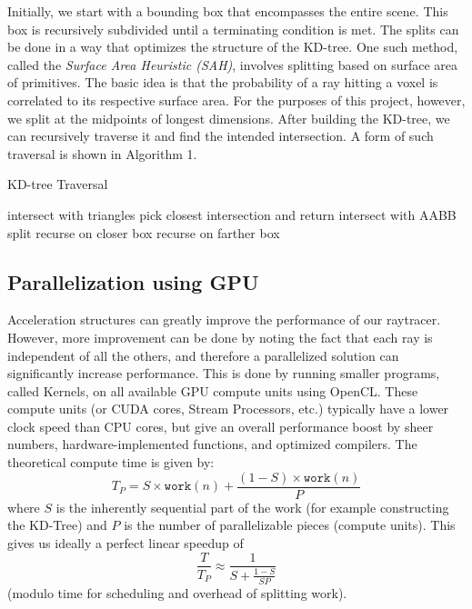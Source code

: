 \documentclass[letterpaper, 10 pt, conference]{ieeeconf}  %
\begin{document}
Initially, we start with a bounding box that encompasses the entire scene. This box is recursively subdivided until a terminating condition is met. The splits can be done in a way that optimizes the structure of the KD-tree. One such method, called the \textit{Surface Area Heuristic (SAH)}, involves splitting based on surface area of primitives. The basic idea is that the probability of a ray hitting a voxel is correlated to its respective surface area. For the purposes of this project, however, we split at the midpoints of longest dimensions. After building the KD-tree, we can recursively traverse it and find the intended intersection. A form of such traversal is shown in Algorithm 1.  

\begin{algorithm}[H]
\caption{KD-tree Traversal}
\begin{algorithmic}

    \STATE intersect with triangles
    \STATE pick closest intersection and return 
    \ENDIF
\ELSE
    \STATE intersect with AABB split 
        \STATE recurse on closer box
    \ENDIF
        \STATE recurse on farther box
    \ENDIF
\ENDIF
\end{algorithmic}
\end{algorithm}

\subsection{Parallelization using GPU}

Acceleration structures can greatly improve the performance of our raytracer. However, more improvement can be done by noting the fact that each ray is independent of all the others, and therefore a parallelized solution can significantly increase performance. This is done by running smaller programs, called Kernels, on all available GPU compute units using OpenCL. These compute units (or CUDA cores, Stream Processors, etc.) typically have a lower clock speed than CPU cores, but give an overall performance boost by sheer numbers, hardware-implemented functions, and optimized compilers. The theoretical compute time is given by:
\[T_P=S\times\mathtt{work}(n)+\frac{(1-S)\times\mathtt{work}(n)}{P}\]
where $S$ is the inherently sequential part of the work (for example constructing the KD-Tree) and $P$ is the number of parallelizable pieces (compute units). This gives us ideally a perfect linear speedup of
\[\frac{T}{T_P}\approx\frac{1}{S+\frac{1-S}{SP}}\]
(modulo time for scheduling and overhead of splitting work).
\end{document}
